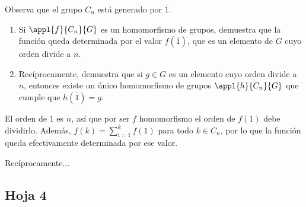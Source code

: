 \begin{problem}[11]

\ppart Observa que el grupo $C_n$ está generado por $\bar{1}$. 

\begin{enumerate}
\item Si $\appl{f}{C_n}{G}$ es un homomorfismo de grupos, demuestra que la función queda determinada por el valor $f(\bar{1})$, que es un elemento de $G$ cuyo orden divide a $n$.
\item Recíprocamente, demuestra que si $g∈G$ es un elemento cuyo orden divide a $n$, entonces existe un único homomorfismo de grupos $\appl{h}{C_n}{G}$ que cumple que $h(\bar{1}) = g$.
\end{enumerate}

\solution 

\ppart El orden de $1$ es $n$, así que por ser $f$ homomorfismo el orden de $f(1)$ debe dividirlo. Además, $f(k) = \sum_{i=1}^k f(1)$ para todo $k∈C_n$, por lo que la función queda efectivamente determinada por ese valor.

Recíprocamente...
\end{problem}

\subsection{Hoja 4}

